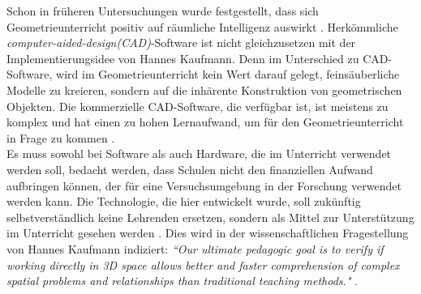 \documentclass[deutsch]{llncs}
\begin{document}
\noindent Schon in früheren Untersuchungen wurde festgestellt, dass sich Geometrieunterricht positiv auf räumliche Intelligenz auswirkt \cite{GittlerDifferentialTO}.
Herkömmliche  \emph{computer-aided-design(CAD)}-Software  ist nicht gleichzusetzen mit der Implementierungsidee von Hannes Kaufmann. Denn im Unterschied zu CAD-Software, wird im Geometrieunterricht kein Wert darauf gelegt, feinsäuberliche Modelle zu kreieren, sondern auf die inhärente Konstruktion von geometrischen Objekten. Die kommerzielle CAD-Software, die verfügbar ist, ist meistens zu komplex und hat einen zu hohen Lernaufwand, um für den Geometrieunterricht in Frage zu kommen  \cite{Kaufmann:2002:MGE:1242073.1242086}. \\
Es muss sowohl bei Software als auch Hardware, die im Unterricht verwendet werden soll, bedacht werden, dass Schulen nicht den finanziellen Aufwand aufbringen können, der für eine Versuchsumgebung in der Forschung verwendet werden kann.  Die Technologie, die hier entwickelt wurde, soll zukünftig selbstverständlich keine Lehrenden ersetzen, sondern als Mittel zur Unterstützung im Unterricht gesehen werden \cite{article}. Dies wird in der wissenschaftlichen Fragestellung von Hannes Kaufmann indiziert: \emph{``Our ultimate pedagogic goal is to verify if working directly in 3D space allows better and faster comprehension of complex spatial problems and relationships than traditional teaching methods."} \cite{1667626}. \\
\end{document}

